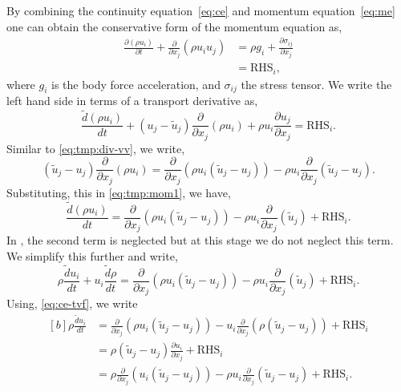 By combining the continuity equation~\eqref{eq:ce} and momentum
equation~\eqref{eq:me} one can obtain the conservative form of the momentum
equation as,
\begin{equation}
\begin{aligned}
  \label{eq:mom-eq-eulerian}
  \frac{\partial (\rho u_i)}{\partial t} +
  \frac{\partial} {\partial x_j} (\rho u_i u_j) &=
  \rho g_i + \frac{\partial \sigma_{ij}}{\partial x_j} \\
  &= \text{RHS}_i,
\end{aligned}
\end{equation}
where $g_i$ is the body force acceleration, and $\sigma_{ij}$ the stress tensor.
We write the left hand side in terms of a transport derivative as,
\begin{equation}
  \label{eq:tmp:mom1}
  \frac{\tilde{d} (\rho u_i)}{d t} +
  (u_j - \tilde{u}_j) \frac{\partial} {\partial x_j} (\rho u_i) +
  \rho u_i \frac{\partial u_j}{\partial x_j} = \text{RHS}_i.
\end{equation}
Similar to \cref{eq:tmp:div-vv}, we write,
\begin{equation}
  \label{eq:tmp:mom2}
  (\tilde{u}_j - u_j) \frac{\partial} {\partial x_j} (\rho u_i) =
  \frac{\partial}{\partial x_j} (\rho u_i (\tilde{u}_j - u_j)) - \rho u_i \frac{\partial}{\partial x_j} (\tilde{u}_j - u_j).
\end{equation}
Substituting, this in \cref{eq:tmp:mom1}, we have,
\begin{equation}
  \label{eq:tmp:mom3}
  \frac{\tilde{d} (\rho u_i)}{d t} =
  \frac{\partial}{\partial x_j} (\rho u_i (\tilde{u}_j - u_j)) - \rho u_i \frac{\partial}{\partial x_j} (\tilde{u}_j) + \text{RHS}_i.
\end{equation}
In \cite{Adami2013}, the second term is neglected but at this stage we do not
neglect this term. We simplify this further and write,
\begin{equation}
  \label{eq:tmp:mom4}
  \rho \frac{\tilde{d} u_i}{d t} + u_i \frac{\tilde{d} \rho}{d t} =
  \frac{\partial}{\partial x_j} (\rho u_i (\tilde{u}_j - u_j)) - \rho u_i \frac{\partial}{\partial x_j} (\tilde{u}_j) + \text{RHS}_i.
\end{equation}
Using, \cref{eq:ce-tvf}, we write
\begin{equation}
  \label{eq:tmp:mom5}
  \begin{aligned}[b]
    \rho \frac{\tilde{d} u_i}{d t} &= \frac{\partial}{\partial x_j} (\rho u_i
    (\tilde{u}_j - u_j)) - u_i \frac{\partial}{\partial x_j}(\rho (\tilde{u}_j
    - u_j)) + \text{RHS}_i\\
    &= \rho (\tilde{u}_j - u_j) \frac{\partial u_i}{\partial x_j} + \text{RHS}_i \\
    &= \rho \frac{\partial}{\partial x_j} (u_i (\tilde{u}_j - u_j)) -
    \rho u_i \frac{\partial}{\partial x_j} (\tilde{u}_j - u_j)
    + \text{RHS}_i.
  \end{aligned}
\end{equation}
